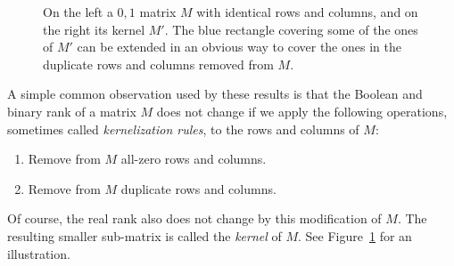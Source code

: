 \documentclass[11pt]{article}
\begin{document}
\begin{figure}[htb!]
\centering
{}
\;\;\;\;\;\;\;\;
\caption{On the left a $0,1$ matrix $M$ with identical rows and columns, and on the right its kernel $M'$.
The blue rectangle covering some of the ones of $M'$ can be extended in an obvious way to cover the ones in the duplicate rows and columns removed from $M$.}
\label{fig:kernel}
\end{figure}

A simple common observation used by these results is that the Boolean and binary rank of a matrix $M$ does not change if we apply the following operations,
sometimes called  {\em kernelization rules}, to the rows and columns of $M$:
\begin{enumerate}
\item Remove from $M$ all-zero rows and columns.
\item Remove from $M$ duplicate rows and columns.
\end{enumerate}
Of course, the real rank also does not change by this modification of $M$. The resulting smaller sub-matrix is called the {\em kernel} of $M$.
See Figure~\ref{fig:kernel} for an illustration.
\end{document}
